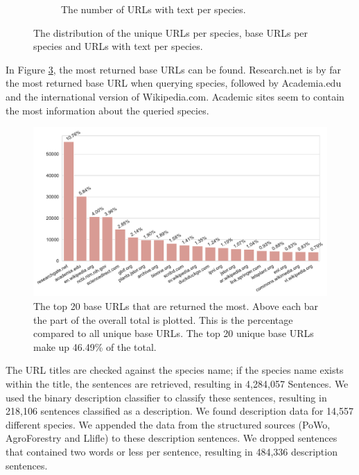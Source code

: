 \documentclass[a4paper, 12pt, oneside]{book} %
\begin{document}
\begin{figure} [htpb]
\begin{subfigure}[b]{1\textwidth}
         \caption{The number of URLs with text per species.}
         \label{fig:URL_distribution_3}
     \end{subfigure}
     \caption[The URL, base URL and URLs with text per Species]{The distribution of the unique URLs per species, base  URLs per species and URLs with text per species.}
     \label{fig:URL_distribution}
\end{figure}

In Figure \ref{fig:URL_top20}, the most returned base URLs can be found.
Research.net is by far the most returned base URL when querying species, followed by Academia.edu and the international version of Wikipedia.com.
Academic sites seem to contain the most information about the queried species.
\begin{figure}[t]
 \centering
 \includegraphics[width=\textwidth]{figures/URL_top20.pdf}
 \caption[The top 20 returned base URLs]{The top 20 base URLs that are returned the most. Above each bar the part of the overall total is plotted. This is the percentage compared to all unique base URLs. The top 20 unique base URLs make up 46.49\% of the total.}
 \label{fig:URL_top20}
\end{figure}

The URL titles are checked against the species name; if the species name exists within the title, the sentences are retrieved, resulting in 4,284,057 Sentences.
We used the binary description classifier to classify these sentences, resulting in 218,106 sentences classified as a description.
We found description data for 14,557 different species.
We appended the data from the structured sources (PoWo, AgroForestry and Llifle) to these description sentences.
We dropped sentences that contained two words or less per sentence, resulting in 484,336 description sentences.
\end{document}
